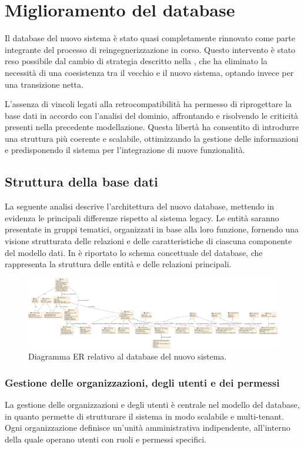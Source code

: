 \section{Miglioramento del database}
Il database del nuovo sistema è stato quasi completamente rinnovato come parte integrante del processo di reingegnerizzazione in corso. Questo intervento è stato reso possibile dal cambio di strategia descritto nella , che ha eliminato la necessità di una coesistenza tra il vecchio e il nuovo sistema, optando invece per una transizione netta.

L’assenza di vincoli legati alla retrocompatibilità ha permesso di riprogettare la base dati in accordo con l’analisi del dominio, affrontando e risolvendo le criticità presenti nella precedente modellazione. Questa libertà ha consentito di introdurre una struttura più coerente e scalabile, ottimizzando la gestione delle informazioni e predisponendo il sistema per l’integrazione di nuove funzionalità.

\subsection{Struttura della base dati}
La seguente analisi descrive l'architettura del nuovo database, mettendo in evidenza le principali differenze rispetto al sistema legacy. Le entità saranno presentate in gruppi tematici, organizzati in base alla loro funzione, fornendo una visione strutturata delle relazioni e delle caratteristiche di ciascuna componente del modello dati. In  è riportato lo schema concettuale del database, che rappresenta la struttura delle entità e delle relazioni principali.

\begin{figure}
  \centering
  \includegraphics[width=1\textwidth]{figures/new_database_schema.pdf}
  \caption{Diagramma ER relativo al database del nuovo sistema.}
  \label{fig:database-schema}
\end{figure}

\subsubsection{Gestione delle organizzazioni, degli utenti e dei permessi}
La gestione delle organizzazioni e degli utenti è centrale nel modello del database, in quanto permette di strutturare il sistema in modo scalabile e multi-tenant. Ogni organizzazione definisce un'unità amministrativa indipendente, all'interno della quale operano utenti con ruoli e permessi specifici.

